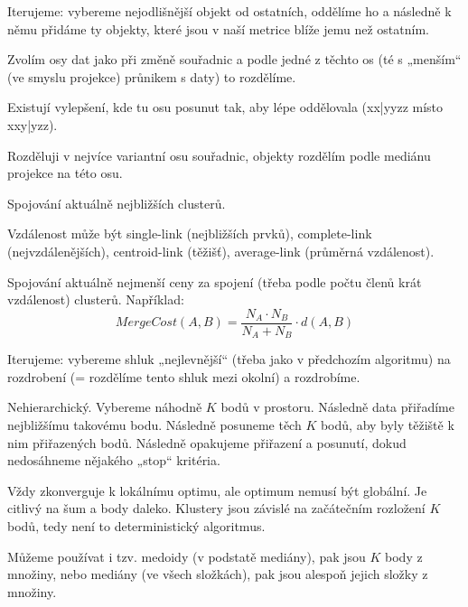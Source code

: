 \documentclass[12pt]{article}					%
\begin{document}
    \begin{definice}
        Iterujeme: vybereme nejodlišnější objekt od ostatních, oddělíme ho a následně k němu přidáme ty objekty, které jsou v naší metrice blíže jemu než ostatním.
    \end{definice}

    \begin{definice}
        Zvolím osy dat jako při změně souřadnic a podle jedné z těchto os (té s „menším“ (ve smyslu projekce) průnikem s daty) to rozdělíme.

        Existují vylepšení, kde tu osu posunut tak, aby lépe oddělovala (xx|yyzz místo xxy|yzz).
    \end{definice}

    \begin{definice}
        Rozděluji v nejvíce variantní osu souřadnic, objekty rozdělím podle mediánu projekce na této osu.
    \end{definice}

    \begin{definice}
        Spojování aktuálně nejbližších clusterů.

        Vzdálenost může být single-link (nejbližších prvků), complete-link (nejvzdálenějších), centroid-link (těžišť), average-link (průměrná vzdálenost).
    \end{definice}

    \begin{definice}
        Spojování aktuálně nejmenší ceny za spojení (třeba podle počtu členů krát vzdálenost) clusterů. Například:
        $$ MergeCost(A, B) = \frac{N_A·N_B}{N_A + N_B}·d(A, B) $$ 
    \end{definice}

    \begin{definice}
            Iterujeme: vybereme shluk „nejlevnější“ (třeba jako v předchozím algoritmu) na rozdrobení (= rozdělíme tento shluk mezi okolní) a rozdrobíme.
    \end{definice}


    \begin{definice}
        Nehierarchický. Vybereme náhodně $K$ bodů v prostoru. Následně data přiřadíme nejbližšímu takovému bodu. Následně posuneme těch $K$ bodů, aby byly těžiště k nim přiřazených bodů. Následně opakujeme přiřazení a posunutí, dokud nedosáhneme nějakého „stop“ kritéria.

        Vždy zkonverguje k lokálnímu optimu, ale optimum nemusí být globální. Je citlivý na šum a body daleko. Klustery jsou závislé na začátečním rozložení $K$ bodů, tedy není to deterministický algoritmus.

        Můžeme používat i tzv. medoidy (v podstatě mediány), pak jsou $K$ body z množiny, nebo mediány (ve všech složkách), pak jsou alespoň jejich složky z množiny.
    \end{definice}
\end{document}
